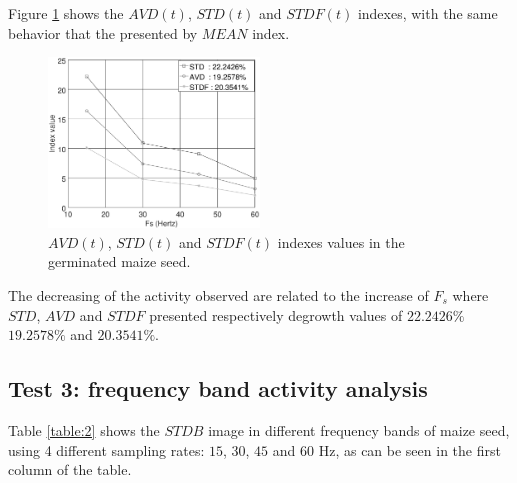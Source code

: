\documentclass[review]{elsarticle}
\begin{document}
Figure \ref{fig:INDEXtest2} shows the $AVD(t)$, $STD(t)$ and $STDF(t)$ indexes,
with the same behavior that the presented by $MEAN$ index.
\begin{figure}[ht!]
    \centering
    \includegraphics[width=0.5\textwidth]{FPS_Semilla_3_3diasALL.eps}
    \caption{$AVD(t)$, $STD(t)$ and $STDF(t)$ indexes values in the germinated maize seed.}\label{fig:INDEXtest2}
\end{figure}
The decreasing of the activity observed are related to the increase of $F_s$
where $STD$, $AVD$ and $STDF$ presented respectively degrowth values of $22.2426\%$
 $19.2578\%$ and $20.3541\%$.


\subsection{Test 3: frequency band activity analysis}
\label{subsec:resulttest3}
Table \ref{table:2} shows the 
$STDB$ image in different frequency bands 
of maize seed,
using 4 different sampling rates: $15$, $30$, $45$ and $60$ Hz, as
can be seen in the first column of the table.
\end{document}
